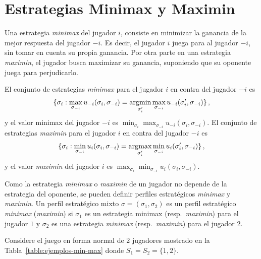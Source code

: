 \chapter{Estrategias Minimax y Maximin}
\label{apex:chapter:estrategias}

Una estrategia \textit{minimax} del jugador $i$, consiste en minimizar la ganancia de la mejor respuesta del jugador $-i$. Es decir, el jugador $i$ juega para  al jugador $-i$, sin tomar en cuenta su propia ganancia. Por otra parte en una estrategia \textit{maximin}, el jugador busca maximizar su ganancia, suponiendo que su oponente juega para perjudicarlo.

\begin{definition}
El conjunto de estrategias \textit{minimax} para el jugador $i$ en contra del jugador $-i$ es
\begin{alignat}{1}
\{ \sigma_i : \max_{\sigma_{-i}}u_{-i}(\sigma_i, \sigma_{-i}) = \operatorname*{\arg\!\min}_{\sigma'_i}{\max_{\sigma_{-i}} u_{-i}(\sigma'_i, \sigma_{-i})} \}\,,
\end{alignat}
y el valor minimax del jugador $-i$ es $\min_{\sigma_i}{\max_{\sigma_{-i}}{u_{-i}(\sigma_i, \sigma_{-i})}}$.
El conjunto de estrategias \textit{maximin} para el jugador $i$ en contra del jugador $-i$ es
\begin{alignat}{1}
\{ \sigma_i : \min_{\sigma_{-i}}u_i(\sigma_i, \sigma_{-i}) = \operatorname*{\arg\!\max}_{\sigma'_i}{\min_{\sigma_{-i}} u_i(\sigma'_i, \sigma_{-i})} \}\,,
\end{alignat}
y el valor \textit{maximin} del jugador $i$ es $\max_{\sigma_i}{\min_{\sigma_{-i}}{u_i(\sigma_i, \sigma_{-i})}}$.
\end{definition}

Como la estrategia \textit{minimax} o \textit{maximin} de un jugador no depende de la estrategia del oponente, se pueden definir perfiles estratégicos \textit{minimax} y \textit{maximin}. Un perfil estratégico mixto $\sigma = (\sigma_1, \sigma_2)$ es un perfil estratégico \textit{minimax} (\textit{maximin}) si $\sigma_1$ es un estrategia minimax (resp.\ \textit{maximin}) para el jugador $1$ y $\sigma_2$ es una estrategia \textit{minimax} (resp.\ \textit{maximin}) para el jugador $2$.

\begin{example}
\label{ex:ejemplos-min-max}
Considere el juego en forma normal de $2$ jugadores mostrado en la Tabla~\ref{table:ejemplos-min-max} donde $S_1 = S_2 = \{1, 2\}$.
\end{example}


